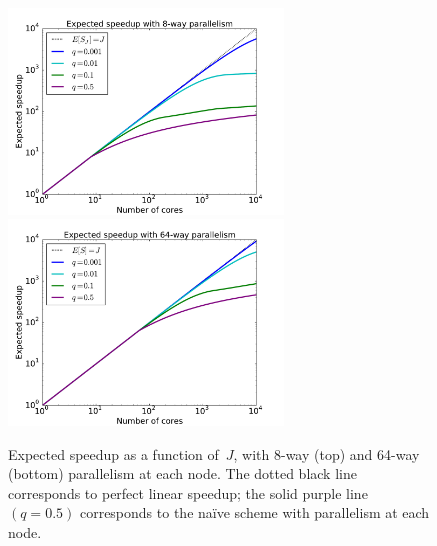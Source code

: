 \documentclass[angelino.tex]{subfiles}
\begin{document}
\begin{figure}[t!]
\centering
\includegraphics[width=0.65\textwidth]{figs/speedup-8.pdf}
\baselineskip
\includegraphics[width=0.65\textwidth]{figs/speedup-64.pdf}
\caption{Expected speedup as a function of~$J$,
with 8-way (top) and 64-way (bottom) parallelism at each node.
The dotted black line corresponds to perfect linear speedup;
the solid purple line $(q=0.5)$ corresponds to the na\"ive scheme with
parallelism at each node.}
\label{fig:multi-way}
\end{figure}
\end{document}
